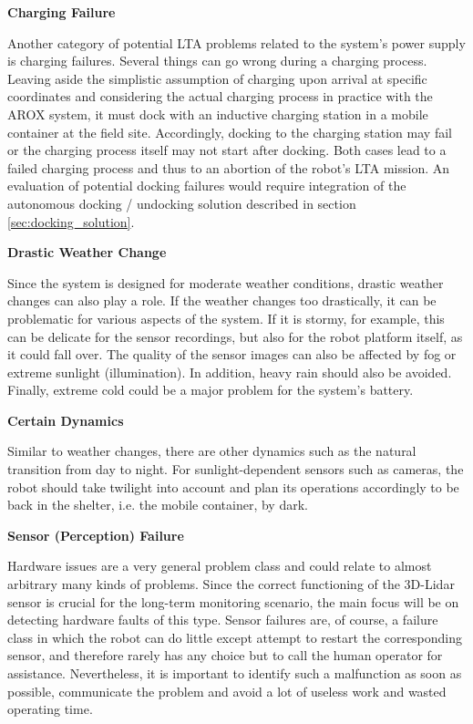 \documentclass[english, master, utf8]{base/thesis_KBS}
\begin{document}
\noindent
\textbf{Charging Failure}\newline

\noindent
Another category of potential LTA problems related to the system's power supply is charging failures. Several things can go wrong during a charging process. 
Leaving aside the simplistic assumption of charging upon arrival at specific coordinates and considering the actual charging process 
in practice with the AROX system, it must dock with an inductive charging station in a mobile container at the field site.
Accordingly, docking to the charging station may fail or the charging process itself may not start after docking.
Both cases lead to a failed charging process and thus to an abortion of the robot's LTA mission. An evaluation of potential docking failures would require 
integration of the autonomous docking / undocking solution described in section \ref{sec:docking_solution}.\newline

\noindent
\textbf{Drastic Weather Change}\newline

\noindent
Since the system is designed for moderate weather conditions, drastic weather changes can also play a role.
If the weather changes too drastically, it can be problematic for various aspects of the system.
If it is stormy, for example, this can be delicate for the sensor recordings, but also for the robot platform itself, as it could fall over.
The quality of the sensor images can also be affected by fog or extreme sunlight (illumination).
In addition, heavy rain should also be avoided. Finally, extreme cold could be a major problem for the system's battery.\newline

\noindent
\textbf{Certain Dynamics}\newline

\noindent
Similar to weather changes, there are other dynamics such as the natural transition from day to night. For sunlight-dependent sensors such as cameras, 
the robot should take twilight into account and plan its operations accordingly to be back in the shelter, i.e. the mobile container, by dark.\newline

\noindent
\textbf{Sensor (Perception) Failure}\newline

\noindent
Hardware issues are a very general problem class and could relate to almost arbitrary many kinds of problems.
Since the correct functioning of the 3D-Lidar sensor is crucial for the long-term monitoring scenario,
the main focus will be on detecting hardware faults of this type. Sensor failures are, of course, a failure class in which the robot can do little except 
attempt to restart the corresponding sensor, and therefore rarely has any choice but to call the human operator for assistance. 
Nevertheless, it is important to identify such a malfunction as soon as possible, communicate the problem and avoid a lot of useless work and wasted operating time.\newline
\end{document}
